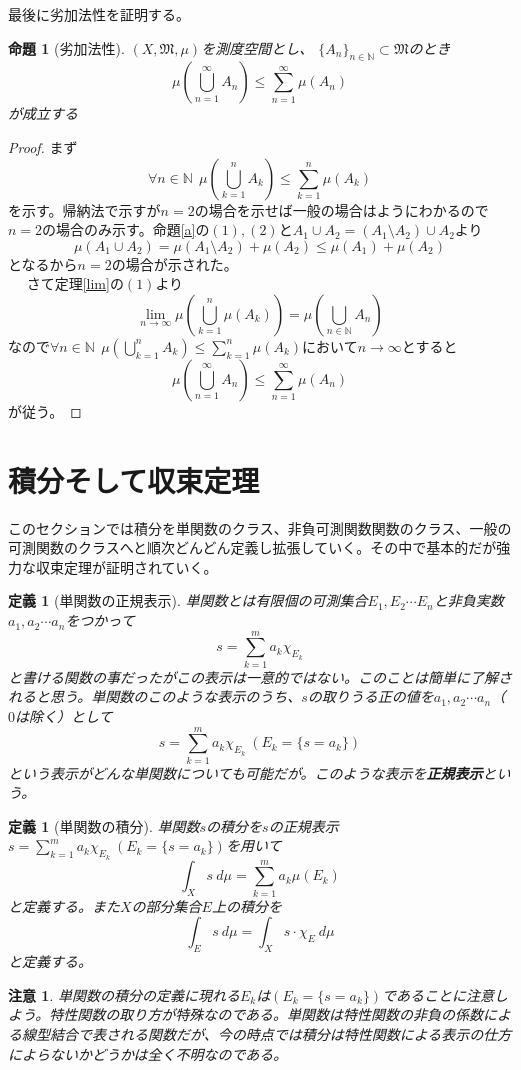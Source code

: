 \documentclass[leqno]{jsarticle}
\newtheorem{prop}[thm]{命題}
\newtheorem{df}[thm]{定義}
\newtheorem*{cau}{注意}
\newcommand{\nn}{\mathbb{N}}
\newcommand{\mgn}{\infty}
\newcommand{\dpst}{\displaystyle}
\newcommand{\mm}{\mathfrak{M}}
\begin{document}
最後に劣加法性を証明する。
\begin{prop}[劣加法性]$(X,\mm,\mu)$を測度空間とし、
$\{A_n\}_{n\in \nn}\subset \mm$のとき
\[
\mu\left(\bigcup_{n=1}^{\mgn}A_n\right)\le\sum_{n=1}^{\mgn}\mu(A_n)
\]
が成立する
\end{prop}
\begin{proof}
まず
\[
\forall n\in \nn\ \ 
\mu\left(\bigcup_{k=1}^nA_k\right)\le
 \sum_{k=1}^n\mu(A_k)
\]
を示す。帰納法で示すが$n=2$の場合を示せば一般の場合はようにわかるので$n=2$の場合のみ示す。命題\ref{a}の$(1),(2)$と$A_1\cup A_2=(A_1\setminus A_2)\cup A_2$より
\[
\mu(A_1\cup A_2)=\mu(A_1\setminus A_2)+\mu(A_2)\le \mu(A_1)+\mu(A_2)
\]
となるから$n=2$の場合が示された。\\　
さて定理\ref{lim}の$(1)$より
\[
\lim_{n\to\mgn}\mu\left(\bigcup_{k=1}^n\mu(A_k)\right)=
\mu\left(\bigcup_{n\in\nn}A_n\right)
\]
なので$\dpst \forall n\in \nn\ \ \mu\left(\bigcup_{k=1}^nA_k\right)\le
 \sum_{k=1}^n\mu(A_k)$において$n\to\mgn$とすると
\[
\mu\left(\bigcup_{n=1}^{\mgn}A_n\right)\le\sum_{n=1}^{\mgn}\mu(A_n)
\]
が従う。
\end{proof}

\section{積分そして収束定理}
このセクションでは積分を単関数のクラス、非負可測関数関数のクラス、一般の可測関数のクラスへと順次どんどん定義し拡張していく。その中で基本的だが強力な収束定理が証明されていく。

\begin{df}[単関数の正規表示]
単関数とは有限個の可測集合$E_1,E_2\cdots E_n$と非負実数$a_1,a_2\cdots a_n$をつかって
\[
s=\sum_{k=1}^ma_k\chi_{E_k}
\]
と書ける関数の事だったがこの表示は一意的ではない。このことは簡単に了解されると思う。単関数のこのような表示のうち、$s$の取りうる正の値を$a_1,a_2\cdots a_n$（$0$は除く）として
\[
s=\sum_{k=1}^{m}a_k\chi_{E_k} \ (E_k=\{s=a_k\})
\]
という表示がどんな単関数についても可能だが。このような表示を{\bf 正規表示}という。
\end{df}

\begin{df}[単関数の積分]単関数$s$の積分を$s$の正規表示$\displaystyle s=\sum_{k=1}^{m}a_k\chi_{E_k} \ (E_k=\{s=a_k\})$を用いて
\[
\int_{X}s\ d\mu=\sum_{k=1}^{m}a_k\mu(E_k)
\]
と定義する。また$X$の部分集合$E$上の積分を
\[
\int_{E}s\ d\mu=\int_{X}s\cdot \chi_{E}\ d\mu
\]
と定義する。
\end{df}
\begin{cau}
単関数の積分の定義に現れる$E_k$は$(E_k=\{s=a_k\})$であることに注意しよう。特性関数の取り方が特殊なのである。単関数は特性関数の非負の係数による線型結合で表される関数だが、今の時点では積分は特性関数による表示の仕方によらないかどうかは全く不明なのである。
\end{cau}
\end{document}
